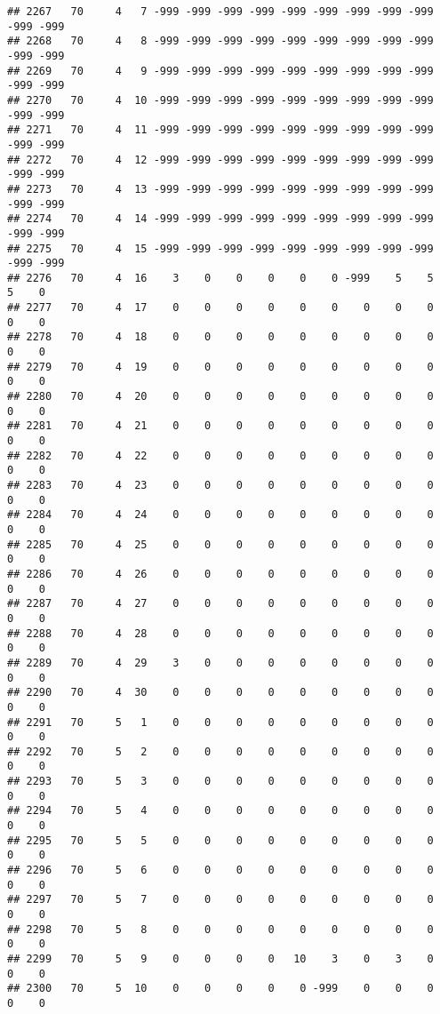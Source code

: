 \documentclass[]{article}
\begin{document}
\begin{verbatim}
## 2267   70     4   7 -999 -999 -999 -999 -999 -999 -999 -999 -999 -999 -999
## 2268   70     4   8 -999 -999 -999 -999 -999 -999 -999 -999 -999 -999 -999
## 2269   70     4   9 -999 -999 -999 -999 -999 -999 -999 -999 -999 -999 -999
## 2270   70     4  10 -999 -999 -999 -999 -999 -999 -999 -999 -999 -999 -999
## 2271   70     4  11 -999 -999 -999 -999 -999 -999 -999 -999 -999 -999 -999
## 2272   70     4  12 -999 -999 -999 -999 -999 -999 -999 -999 -999 -999 -999
## 2273   70     4  13 -999 -999 -999 -999 -999 -999 -999 -999 -999 -999 -999
## 2274   70     4  14 -999 -999 -999 -999 -999 -999 -999 -999 -999 -999 -999
## 2275   70     4  15 -999 -999 -999 -999 -999 -999 -999 -999 -999 -999 -999
## 2276   70     4  16    3    0    0    0    0    0 -999    5    5    5    0
## 2277   70     4  17    0    0    0    0    0    0    0    0    0    0    0
## 2278   70     4  18    0    0    0    0    0    0    0    0    0    0    0
## 2279   70     4  19    0    0    0    0    0    0    0    0    0    0    0
## 2280   70     4  20    0    0    0    0    0    0    0    0    0    0    0
## 2281   70     4  21    0    0    0    0    0    0    0    0    0    0    0
## 2282   70     4  22    0    0    0    0    0    0    0    0    0    0    0
## 2283   70     4  23    0    0    0    0    0    0    0    0    0    0    0
## 2284   70     4  24    0    0    0    0    0    0    0    0    0    0    0
## 2285   70     4  25    0    0    0    0    0    0    0    0    0    0    0
## 2286   70     4  26    0    0    0    0    0    0    0    0    0    0    0
## 2287   70     4  27    0    0    0    0    0    0    0    0    0    0    0
## 2288   70     4  28    0    0    0    0    0    0    0    0    0    0    0
## 2289   70     4  29    3    0    0    0    0    0    0    0    0    0    0
## 2290   70     4  30    0    0    0    0    0    0    0    0    0    0    0
## 2291   70     5   1    0    0    0    0    0    0    0    0    0    0    0
## 2292   70     5   2    0    0    0    0    0    0    0    0    0    0    0
## 2293   70     5   3    0    0    0    0    0    0    0    0    0    0    0
## 2294   70     5   4    0    0    0    0    0    0    0    0    0    0    0
## 2295   70     5   5    0    0    0    0    0    0    0    0    0    0    0
## 2296   70     5   6    0    0    0    0    0    0    0    0    0    0    0
## 2297   70     5   7    0    0    0    0    0    0    0    0    0    0    0
## 2298   70     5   8    0    0    0    0    0    0    0    0    0    0    0
## 2299   70     5   9    0    0    0    0   10    3    0    3    0    0    0
## 2300   70     5  10    0    0    0    0    0 -999    0    0    0    0    0

\end{verbatim}
\end{document}
